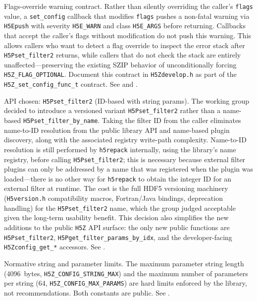 \documentclass[../RFC-HDFG-2026-001.tex]{subfiles}
\begin{document}
Flags-override warning contract. Rather than silently overriding the
caller's \texttt{flags} value, a \texttt{set\_config} callback that modifies \texttt{flags}
pushes a non-fatal warning via \texttt{H5Epush} with severity \texttt{H5E\_WARN} and class
\texttt{H5E\_ARGS} before returning. Callbacks that accept the caller's flags
without modification do not push this warning. This allows callers who want
to detect a flag override to inspect the error stack after
\texttt{H5Pset\_filter2} returns, while callers that do not check the stack
are entirely unaffected---preserving the existing SZIP behavior of
unconditionally forcing \texttt{H5Z\_FLAG\_OPTIONAL}. Document this contract in
\texttt{H5Zdevelop.h} as part of the \texttt{H5Z\_set\_config\_func\_t}
contract. See  and .

API chosen: \texttt{H5Pset\_filter2} (ID-based with string params). The
working group decided to introduce a versioned variant \texttt{H5Pset\_filter2} rather
than a name-based \texttt{H5Pset\_filter\_by\_name}. Taking the filter ID from the
caller eliminates name-to-ID resolution from the public library API and
name-based plugin discovery, along with the associated registry write-path
complexity.  Name-to-ID resolution is still performed by \texttt{h5repack}
internally, using the library's name registry, before calling
\texttt{H5Pset\_filter2}; this is necessary because external filter plugins
can only be addressed by a name that was registered when the plugin was
loaded---there is no other way for \texttt{h5repack} to obtain the integer ID
for an external filter at runtime. The cost is the full HDF5 versioning
machinery (\texttt{H5version.h} compatibility macros, Fortran/Java bindings,
deprecation handling) for the \texttt{H5Pset\_filter2} name, which the group judged
acceptable given the long-term usability benefit. This decision also simplifies
the new additions to the public \texttt{H5Z} API surface: the only new public
functions are \texttt{H5Pset\_filter2}, \texttt{H5Pget\_filter\_params\_by\_idx},
and the developer-facing \texttt{H5Zconfig\_get\_*} accessors. See
.

Normative string and parameter limits. The maximum parameter string length
(4096~bytes, \texttt{H5Z\_CONFIG\_STRING\_MAX}) and the maximum number of
parameters per string (64, \texttt{H5Z\_CONFIG\_MAX\_PARAMS}) are hard limits
enforced by the library, not recommendations. Both
constants are public. See .
\end{document}
